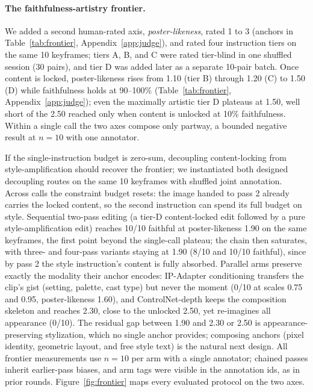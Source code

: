 \documentclass[10pt]{article}
\begin{document}
\paragraph{The faithfulness-artistry frontier.}
We added a second human-rated axis, \emph{poster-likeness}, rated 1 to 3 (anchors in Table~\ref{tab:frontier}, Appendix~\ref{app:judge}), and rated four instruction tiers on the same 10 keyframes; tiers A, B, and C were rated tier-blind in one shuffled session (30 pairs), and tier D was added later as a separate 10-pair batch. Once content is locked, poster-likeness rises from 1.10 (tier B) through 1.20 (C) to 1.50 (D) while faithfulness holds at 90--100\% (Table~\ref{tab:frontier}, Appendix~\ref{app:judge}); even the maximally artistic tier D plateaus at 1.50, well short of the 2.50 reached only when content is unlocked at 10\% faithfulness. Within a single call the two axes compose only partway, a bounded negative result at $n=10$ with one annotator.

If the single-instruction budget is zero-sum, decoupling content-locking from style-amplification should recover the frontier; we instantiated both designed decoupling routes on the same 10 keyframes with shuffled joint annotation. Across calls the constraint budget resets: the image handed to pass 2 already carries the locked content, so the second instruction can spend its full budget on style. Sequential two-pass editing (a tier-D content-locked edit followed by a pure style-amplification edit) reaches 10/10 faithful at poster-likeness 1.90 on the same keyframes, the first point beyond the single-call plateau; the chain then saturates, with three- and four-pass variants staying at 1.90 (8/10 and 10/10 faithful), since by pass 2 the style instruction's content is fully absorbed. Parallel arms preserve exactly the modality their anchor encodes: IP-Adapter conditioning transfers the clip's gist (setting, palette, cast type) but never the moment (0/10 at scales 0.75 and 0.95, poster-likeness 1.60), and ControlNet-depth keeps the composition skeleton and reaches 2.30, close to the unlocked 2.50, yet re-imagines all appearance (0/10). The residual gap between 1.90 and 2.30 or 2.50 is appearance-preserving stylization, which no single anchor provides; composing anchors (pixel identity, geometric layout, and free style text) is the natural next design. All frontier measurements use $n=10$ per arm with a single annotator; chained passes inherit earlier-pass biases, and arm tags were visible in the annotation ids, as in prior rounds. Figure~\ref{fig:frontier} maps every evaluated protocol on the two axes.
\end{document}
